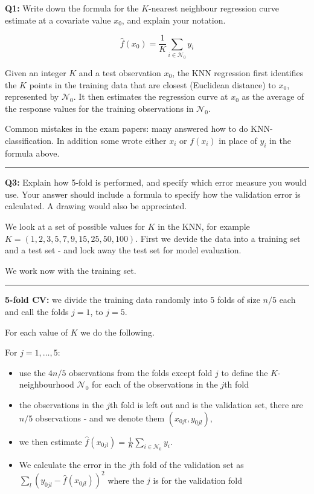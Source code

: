 \documentclass[]{article}
\providecommand{\tightlist}{%
  \setlength{\itemsep}{0pt}\setlength{\parskip}{0pt}}
\begin{document}
\textbf{Q1:} Write down the formula for the \(K\)-nearest neighbour
regression curve estimate at a covariate value \(x_0\), and explain your
notation.

\[\hat{f}(x_0)=\frac{1}{K}\sum_{i\in \mathcal{N}_0} y_i\]

Given an integer \(K\) and a test observation \(x_0\), the KNN
regression first identifies the \(K\) points in the training data that
are closest (Euclidean distance) to \(x_0\), represented by
\(\mathcal{N}_0\). It then estimates the regression curve at \(x_0\) as
the average of the response values for the training observations in
\(\mathcal{N}_0\).

Common mistakes in the exam papers: many answered how to do
KNN-classification. In addition some wrote either \(x_i\) or \(f(x_i)\)
in place of \(y_i\) in the formula above.

\begin{center}\rule{0.5\linewidth}{\linethickness}\end{center}

\textbf{Q3:} Explain how 5-fold is performed, and specify which error
measure you would use. Your answer should include a formula to specify
how the validation error is calculated. A drawing would also be
appreciated.

We look at a set of possible values for \(K\) in the KNN, for example
\(K=(1,2,3,5,7,9,15,25,50,100)\). First we devide the data into a
training set and a test set - and lock away the test set for model
evaluation.

We work now with the training set.

\begin{center}\rule{0.5\linewidth}{\linethickness}\end{center}

\textbf{5-fold CV:} we divide the training data randomly into 5 folds of
size \(n/5\) each and call the folds \(j=1\), to \(j=5\).

For each value of \(K\) we do the following.

For \(j=1,\ldots,5\):

\begin{itemize}
\tightlist
\item
  use the \(4n/5\) observations from the folds except fold \(j\) to
  define the \(K\)-neighbourhood \(\mathcal{N}_0\) for each of the
  observations in the \(j\)th fold
\item
  the observations in the \(j\)th fold is left out and is the validation
  set, there are \(n/5\) observations - and we denote them
  \((x_{0jl},y_{0jl})\),
\item
  we then estimate
  \(\hat{f}(x_{0jl})=\frac{1}{K}\sum_{i\in \mathcal{N}_0} y_i\).
\item
  We calculate the error in the \(j\)th fold of the validation set as
  \(\sum_{l} (y_{0jl}-\hat{f}(x_{0jl}))^2\) where the \(j\) is for the
  validation fold
\end{itemize}
\end{document}
